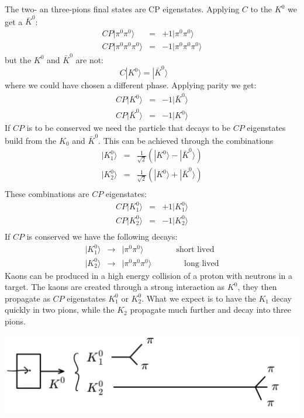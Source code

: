 \documentclass[12pt]{article}
\begin{document}
The two- an three-pions final states are CP eigenstates. Applying $C$ to the $K^0$ we get a $\bar K^0$:
\begin{eqnarray*}
CP|\pi^0\pi^0\rangle &=& +1 |\pi^0\pi^0\rangle\\
CP|\pi^0\pi^0\pi^0\rangle &=& -1 |\pi^0\pi^0\pi^0\rangle
\end{eqnarray*}
but the $K^0$ and $\bar K^0$ are not:
\[C|K^0\rangle =  |\bar K^0\rangle\qquad\]
where we could have chosen a different phase. Applying parity we get:
\begin{eqnarray*}
CP|K^0\rangle &=& -1 |\bar K^0\rangle\\
CP|\bar K^0\rangle &=& -1 |K^0\rangle
\end{eqnarray*}
If $CP$ is to be conserved we need the particle that decays to be $CP$ eigenstates build from the $K_0$ and $\bar K^0$. This can be achieved through the combinations
\begin{eqnarray*}
|K^0_1\rangle &=& \frac{1}{\sqrt{2}}\left( |K^0\rangle  - |\bar K^0\rangle \right)\\
|K^0_2\rangle &=& \frac{1}{\sqrt{2}}\left( |K^0\rangle  + |\bar K^0\rangle \right)\\
\end{eqnarray*}
These combinations are $CP$ eigenstates:
\begin{eqnarray*}
CP|K^0_1\rangle &=& +1 |K^0_1\rangle  \\
CP|K^0_2\rangle &=& -1|K^0_2\rangle   \\
\end{eqnarray*}
If $CP$ is conserved we have the following decays:
\begin{eqnarray*}
|K^0_1\rangle &\rightarrow& |\pi^0\pi^0\rangle 
\qquad \qquad\mbox{short lived}
\\
|K^0_2\rangle &\rightarrow& |\pi^0\pi^0\pi^0\rangle  
\qquad \qquad\mbox{long lived}
\end{eqnarray*}
Kaons can be produced in a high energy collision of a proton with neutrons in a target. The kaons are created through a strong interaction as $K^0$, they then propagate as $CP$ eigenstates $K_1^0$ or $K_2^0$. What we expect is to have the $K_1$ decay quickly in two pions, while the $K_2$ propagate much further and decay into three pions. 
\begin{center}
\includegraphics[scale=0.4]{images/KSKL1.png}
\end{center}
\end{document}
